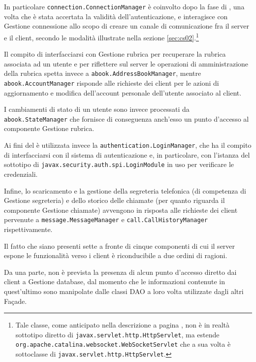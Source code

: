 \begin{description}
In particolare \texttt{connection.ConnectionManager} è coinvolto dopo la fase di , una volta che è stata accertata la validità dell'autenticazione, e interagisce con \textsf{Gestione connessione} allo scopo di creare un canale di comunicazione fra il server e il client, secondo le modalità illustrate nella sezione \ref{sec:cs02}.\footnote{%
Tale classe, come anticipato nella descrizione a pagina \pageref{sec:cs02}, non è in realtà sottotipo diretto di \texttt{javax.servlet.http.HttpServlet}, ma estende \texttt{org.apache.catalina.websocket.WebSocketServlet} che a sua volta è sottoclasse di \texttt{javax.servlet.http.HttpServlet}.
}

Il compito di interfacciarsi con \textsf{Gestione rubrica} per recuperare la rubrica associata ad un utente e per riflettere sul server le operazioni di amministrazione della rubrica spetta invece a \texttt{abook.AddressBookManager}, mentre \texttt{abook.AccountManager} risponde alle richieste dei client per le azioni di aggiornamento e modifica dell'account personale dell'utente associato al client.

I cambiamenti di stato di un utente sono invece processati da \texttt{abook.StateManager} che fornisce di conseguenza anch'esso un punto d'accesso al componente \textsf{Gestione rubrica}.

Ai fini del  è utilizzata invece la  \texttt{authentication.LoginManager}, che ha il compito di interfacciarsi con il sistema di autenticazione e, in particolare, con l'istanza del sottotipo di \texttt{javax.security.auth.spi.LoginModule} in uso per verificare le credenziali.

Infine, lo scaricamento e la gestione della segreteria telefonica (di competenza di \textsf{Gestione segreteria}) e dello storico delle chiamate (per quanto riguarda il componente \textsf{Gestione chiamate}) avvengono in risposta alle richieste dei client pervenute a \texttt{message.MessageManager} e \texttt{call.CallHistoryManager} rispettivamente.

Il fatto che siano presenti sette  a fronte di cinque componenti di cui il server espone le funzionalità verso i client è riconducibile a due ordini di ragioni.

Da una parte, non è prevista la presenza di alcun punto d'accesso diretto dai client a \textsf{Gestione database}, dal momento che le informazioni contenute in quest'ultimo sono manipolate dalle classi DAO a loro volta utilizzate dagli altri Façade.


\end{description}
